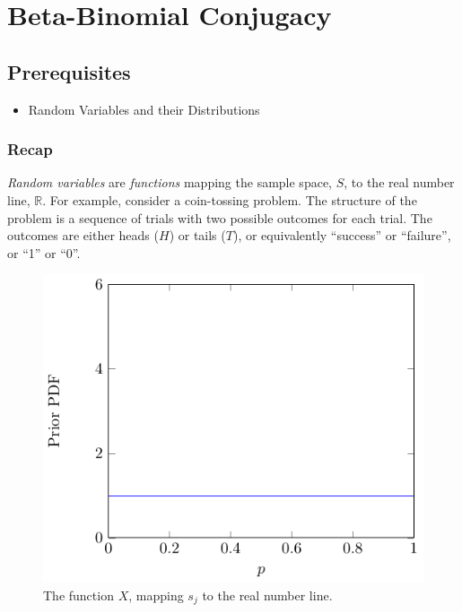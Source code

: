 


\maketitle
\clearpage

\section{Beta-Binomial Conjugacy}

\subsection{Prerequisites}

\begin{itemize}
\item
Random Variables and their Distributions
\end{itemize}

\subsubsection{Recap}

\emph{Random variables} are \emph{functions} 
mapping the sample space, \(S\), 
to the real number line, \(\mathbb{R}\). 
For example, 
consider a coin-tossing problem. 
The structure of the problem is a sequence of trials 
with two possible outcomes for each trial. 
The outcomes are either heads (\(H\)) or tails (\(T\)), 
or equivalently ``success'' or ``failure'', 
or ``1'' or ``0''.

\begin{figure}[h!]
\centering
\includegraphics[width=0.75\linewidth]{tikz/figure1.pdf}
\caption{The function \(X\), mapping \(s_{j}\) to the real number line.}
\label{fig:mapping}
\end{figure}

